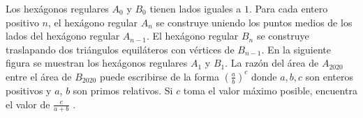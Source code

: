 Los hexágonos regulares $A_0$ y $B_0$ tienen lados iguales a $1$. Para cada entero positivo $n$, el hexágono regular $A_n$ se construye uniendo los puntos medios de los lados del hexágono regular $A_{n-1}$. El hexágono regular $B_n$ se construye traslapando dos triángulos equiláteros con vértices de $B_{n-1}$. En la siguiente figura se muestran los hexágonos regulares $A_1$ y $B_1$. La razón del área de $A_{2020}$ entre el área de $B_{2020}$ puede escribirse de la forma $(\frac ab)^c$ donde $a,b,c$ son enteros positivos y $a$, $b$ son primos relativos. Si $c$ toma el valor máximo posible, encuentra el valor de $\frac{c}{a+b}$ .